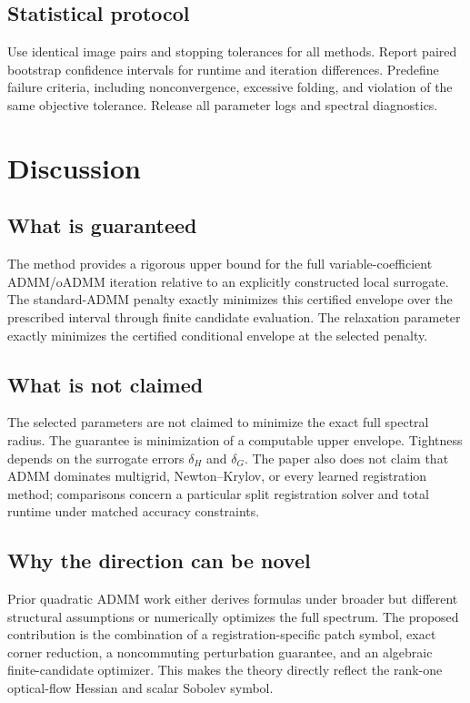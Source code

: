 \documentclass[11pt]{article}
\theoremstyle{definition}
\begin{document}
\subsection{Statistical protocol}
Use identical image pairs and stopping tolerances for all methods. Report paired bootstrap confidence intervals for runtime and iteration differences. Predefine failure criteria, including nonconvergence, excessive folding, and violation of the same objective tolerance. Release all parameter logs and spectral diagnostics.

\section{Discussion}
\subsection{What is guaranteed}
The method provides a rigorous upper bound for the full variable-coefficient ADMM/oADMM iteration relative to an explicitly constructed local surrogate. The standard-ADMM penalty exactly minimizes this certified envelope over the prescribed interval through finite candidate evaluation. The relaxation parameter exactly minimizes the certified conditional envelope at the selected penalty.

\subsection{What is not claimed}
The selected parameters are not claimed to minimize the exact full spectral radius. The guarantee is minimization of a computable upper envelope. Tightness depends on the surrogate errors $\delta_H$ and $\delta_G$. The paper also does not claim that ADMM dominates multigrid, Newton--Krylov, or every learned registration method; comparisons concern a particular split registration solver and total runtime under matched accuracy constraints.

\subsection{Why the direction can be novel}
Prior quadratic ADMM work either derives formulas under broader but different structural assumptions or numerically optimizes the full spectrum. The proposed contribution is the combination of a registration-specific patch symbol, exact corner reduction, a noncommuting perturbation guarantee, and an algebraic finite-candidate optimizer. This makes the theory directly reflect the rank-one optical-flow Hessian and scalar Sobolev symbol.
\end{document}
